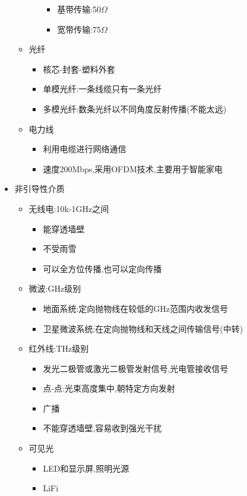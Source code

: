\documentclass[a4paper,12pt,notitlepage]{article}
\begin{document}
\begin{itemize}
\begin{itemize}
\begin{itemize}
			\begin{itemize}
				\item 基带传输:50$\Omega$
				\item 宽带传输:75$\Omega$
			\end{itemize}
		\end{itemize}
		\item 光纤
		\begin{itemize}
			\item 核芯-封套-塑料外套
			\item 单模光纤:一条线缆只有一条光纤
			\item 多模光纤:数条光纤以不同角度反射传播(不能太远)
		\end{itemize}
		\item 电力线
		\begin{itemize}
			\item 利用电缆进行网络通信
			\item 速度200Mbps,采用OFDM技术,主要用于智能家电
		\end{itemize}
	\end{itemize}
	\item 非引导性介质
	\begin{itemize}
		\item 无线电:10k-1GHz之间
		\begin{itemize}
			\item 能穿透墙壁
			\item 不受雨雪
			\item 可以全方位传播,也可以定向传播
		\end{itemize}
		\item 微波:GHz级别
		\begin{itemize}
			\item 地面系统:定向抛物线在较低的GHz范围内收发信号
			\item 卫星微波系统:在定向抛物线和天线之间传输信号(中转)
		\end{itemize}
		\item 红外线:THz级别
		\begin{itemize}
			\item 发光二极管或激光二极管发射信号,光电管接收信号
			\item 点-点:光束高度集中,朝特定方向发射
			\item 广播
			\item 不能穿透墙壁,容易收到强光干扰
		\end{itemize}
		\item 可见光
		\begin{itemize}
			\item LED和显示屏,照明光源
			\item LiFi
		\end{itemize}
	\end{itemize}
\end{itemize}
\end{document}
